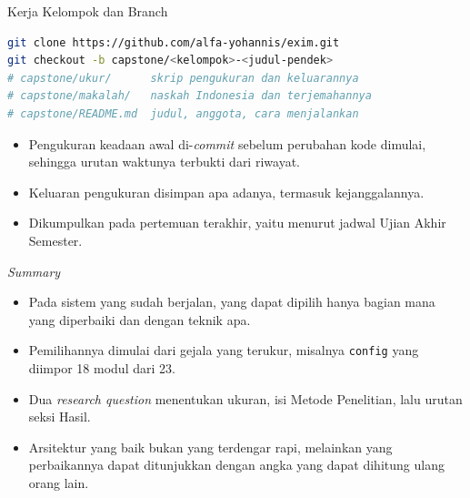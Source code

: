 \documentclass[aspectratio=169, table, 12pt]{beamer}
\begin{document}
\begin{frame}[fragile]{{\Large Kerja Kelompok dan Branch}}
  \vspace{4pt}
\begin{lstlisting}[language=bash]
git clone https://github.com/alfa-yohannis/exim.git
git checkout -b capstone/<kelompok>-<judul-pendek>
# capstone/ukur/      skrip pengukuran dan keluarannya
# capstone/makalah/   naskah Indonesia dan terjemahannya
# capstone/README.md  judul, anggota, cara menjalankan
\end{lstlisting}

  \vspace{4pt}
  \begin{itemize}\small
    \item Pengukuran keadaan awal di-\textit{commit} sebelum perubahan kode
          dimulai, sehingga urutan waktunya terbukti dari riwayat.
    \item Keluaran pengukuran disimpan apa adanya, termasuk kejanggalannya.
    \item Dikumpulkan pada pertemuan terakhir, yaitu menurut jadwal Ujian
          Akhir Semester.
  \end{itemize}
\end{frame}

\begin{frame}{{\Large \textit{Summary}}}
  \vspace{10pt}
  \begin{itemize}\small
    \item Pada sistem yang sudah berjalan, yang dapat dipilih hanya bagian
          mana yang diperbaiki dan dengan teknik apa.
    \item Pemilihannya dimulai dari gejala yang terukur, misalnya
          \texttt{config} yang diimpor 18 modul dari 23.
    \item Dua \textit{research question} menentukan ukuran, isi Metode
          Penelitian, lalu urutan seksi Hasil.
    \item Arsitektur yang baik bukan yang terdengar rapi, melainkan yang
          perbaikannya dapat ditunjukkan dengan angka yang dapat dihitung
          ulang orang lain.
  \end{itemize}
\end{frame}
\end{document}
